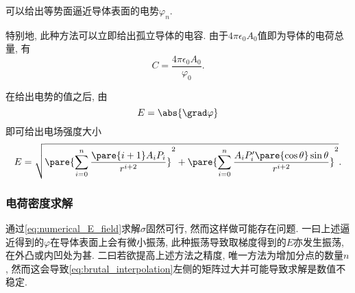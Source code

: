 \documentclass[hidelinks]{ctexart}
\begin{document}
可以给出等势面逼近导体表面的电势$\varphi_n$.
\par
特别地, 此种方法可以立即给出孤立导体的电容. 由于$4\pi\epsilon_0 A_0$值即为导体的电荷总量, 有
\[ C = \frac{4\pi\epsilon_0 A_0}{\varphi_0}. \]

\par
在给出电势的值之后, 由
\[ E = \abs{\grad \varphi} \]
即可给出电场强度大小
\begin{equation}
    \label{eq:numerical_E_field}
    E = \sqrt{\pare{\sum_{i=0}^n \frac{\pare{i+1}A_iP_i}{r^{i+2}}}^2 + \pare{\sum_{i=0}^n \frac{A_i P'_i\pare{\cos\theta}\sin\theta}{r^{i+2}}}^2}.
\end{equation}


\subsubsection*{电荷密度求解} %
\label{ssub:电荷密度求解}

通过\eqref{eq:numerical_E_field}求解$\sigma$固然可行, 然而这样做可能存在问题. 一曰上述逼近得到的$\varphi$在导体表面上会有微小振荡, 此种振荡导致取梯度得到的$E$亦发生振荡, 在外凸或内凹处为甚. 二曰若欲提高上述方法之精度, 唯一方法为增加分点的数量$n$, 然而这会导致\eqref{eq:brutal_interpolation}左侧的矩阵过大并可能导致求解是数值不稳定.
\par
\end{document}
